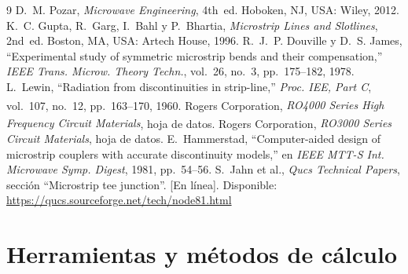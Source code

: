 \documentclass[11pt,letterpaper]{article}
\begin{document}
\begin{thebibliography}{9}
 D.~M. Pozar, \emph{Microwave Engineering}, 4th~ed. Hoboken, NJ, USA: Wiley, 2012.
 K.~C. Gupta, R.~Garg, I.~Bahl y P.~Bhartia, \emph{Microstrip Lines and Slotlines}, 2nd~ed. Boston, MA, USA: Artech House, 1996.
 R.~J.~P. Douville y D.~S. James, ``Experimental study of symmetric microstrip bends and their compensation,'' \emph{IEEE Trans. Microw. Theory Techn.}, vol.~26, no.~3, pp.~175--182, 1978.
 L.~Lewin, ``Radiation from discontinuities in strip-line,'' \emph{Proc. IEE, Part C}, vol.~107, no.~12, pp.~163--170, 1960.
 Rogers Corporation, \emph{RO4000\textsuperscript{\textregistered} Series High Frequency Circuit Materials}, hoja de datos.
 Rogers Corporation, \emph{RO3000\textsuperscript{\textregistered} Series Circuit Materials}, hoja de datos.
 E.~Hammerstad, ``Computer-aided design of microstrip couplers with accurate discontinuity models,'' en \emph{IEEE MTT-S Int. Microwave Symp. Digest}, 1981, pp.~54--56.
 S.~Jahn et al., \emph{Qucs Technical Papers}, sección ``Microstrip tee junction''. [En línea]. Disponible: \url{https://qucs.sourceforge.net/tech/node81.html}
\end{thebibliography}

\appendix
\section{Herramientas y métodos de cálculo}
\label{ap:metodos}
\end{document}
